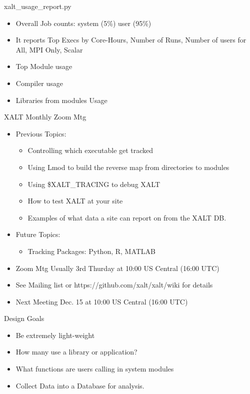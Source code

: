 \documentclass{beamer}
\begin{document}
\begin{frame}{xalt\_usage\_report.py}
  \begin{itemize}
    \item Overall Job counts: system (5\%) user (95\%)
    \item It reports Top Execs by Core-Hours, Number of Runs,
      Number of users for All, MPI Only, Scalar
    \item Top Module usage
    \item Compiler usage
    \item Libraries from modules Usage
  \end{itemize}
\end{frame}

\begin{frame}{XALT Monthly Zoom Mtg}
  \begin{itemize}
    \item Previous Topics:
      \begin{itemize}
        \item Controlling which executable get tracked
        \item Using Lmod to build the reverse map from directories to modules
        \item Using \$XALT\_TRACING to debug XALT
        \item How to test XALT at your site
        \item Examples of what data a site can report on from the XALT DB.
      \end{itemize}
    \item Future Topics:
      \begin{itemize}
        \item Tracking Packages: Python, R, MATLAB
      \end{itemize}
    \item Zoom Mtg Usually 3rd Thurday at 10:00 US Central (16:00 UTC)
    \item See Mailing list or https://github.com/xalt/xalt/wiki for
      details
    \item Next Meeting Dec. 15 at 10:00 US Central (16:00 UTC)
  \end{itemize}
\end{frame}

\begin{frame}{Design Goals}
  \begin{itemize}
    \item Be extremely light-weight
    \item How many use a library or application?
    \item What functions are users calling in system modules
    \item Collect Data into a Database for analysis.
  \end{itemize}
\end{frame}
\end{document}
